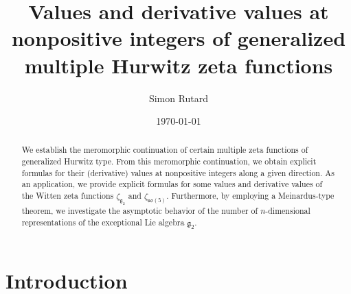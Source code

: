 \documentclass[a4paper]{amsart}
\title[{Special values of multiple Hurwitz zeta functions}]{Values and derivative values at nonpositive integers of generalized multiple Hurwitz zeta functions}
\author{Simon Rutard}
\date{\today}
\theoremstyle{remark}
\theoremstyle{definition}
\begin{document}
\begin{abstract}
We establish the meromorphic continuation of certain multiple zeta functions of generalized Hurwitz type. From this meromorphic continuation, we obtain explicit formulas for their (derivative) values at nonpositive integers along a given direction. As an application, we provide explicit formulas for some values and derivative values of the Witten zeta functions $\zeta_{\mathfrak{g}_2}$ and $\zeta_{\mathfrak{so}(5)}$. Furthermore, by employing a Meinardus-type theorem, we investigate the asymptotic behavior of the number of $n$-dimensional representations of the exceptional Lie algebra $\mathfrak{g}_2$.
\end{abstract}

\maketitle

\section{Introduction}
\end{document}
